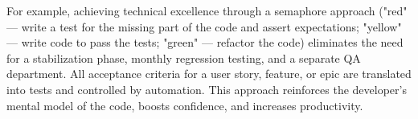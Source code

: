 For example, achieving technical excellence through a semaphore approach ("red" — write a test for the missing part of 
the code and assert expectations; "yellow" — write code to pass the tests; "green" — refactor the code) eliminates the 
need for a stabilization phase, monthly regression testing, and a separate QA department. All acceptance criteria for a 
user story, feature, or epic are translated into tests and controlled by automation. This approach reinforces the 
developer's mental model of the code, boosts confidence, and increases productivity.
